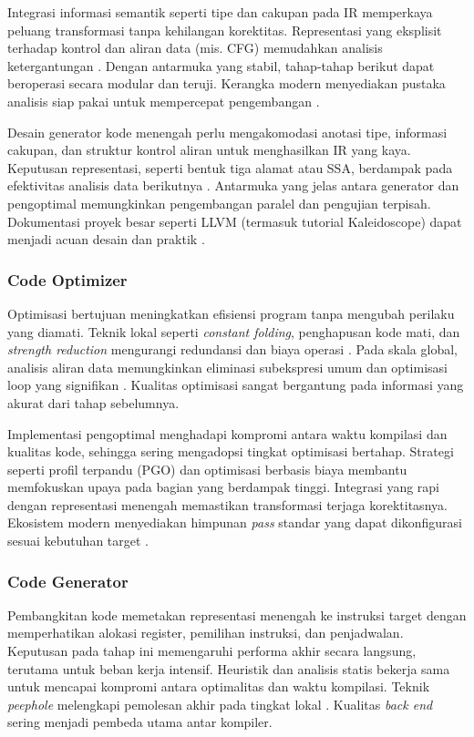 \documentclass[../main.tex]{subfiles}
\begin{document}
Integrasi informasi semantik seperti tipe dan cakupan pada IR memperkaya peluang transformasi tanpa kehilangan korektitas. Representasi yang eksplisit terhadap kontrol dan aliran data (mis. CFG) memudahkan analisis ketergantungan \citep{WikiCFG}. Dengan antarmuka yang stabil, tahap-tahap berikut dapat beroperasi secara modular dan teruji. Kerangka modern menyediakan pustaka analisis siap pakai untuk mempercepat pengembangan \citep{LLVMOverview}.

Desain generator kode menengah perlu mengakomodasi anotasi tipe, informasi cakupan, dan struktur kontrol aliran untuk menghasilkan IR yang kaya. Keputusan representasi, seperti bentuk tiga alamat atau SSA, berdampak pada efektivitas analisis data berikutnya \citep{WikiSSA}. Antarmuka yang jelas antara generator dan pengoptimal memungkinkan pengembangan paralel dan pengujian terpisah. Dokumentasi proyek besar seperti LLVM (termasuk tutorial Kaleidoscope) dapat menjadi acuan desain dan praktik \citep{LLVMOverview,LLVMKaleidoscope}.

\subsubsection{Code Optimizer}
Optimisasi bertujuan meningkatkan efisiensi program tanpa mengubah perilaku yang diamati. Teknik lokal seperti \emph{constant folding}, penghapusan kode mati, dan \emph{strength reduction} mengurangi redundansi dan biaya operasi \citep{WikiConstantFolding,WikiDCE,WikiStrengthReduction}. Pada skala global, analisis aliran data memungkinkan eliminasi subekspresi umum dan optimisasi loop yang signifikan \citep{WikiCSE,WikiLoopOptimization}. Kualitas optimisasi sangat bergantung pada informasi yang akurat dari tahap sebelumnya.

Implementasi pengoptimal menghadapi kompromi antara waktu kompilasi dan kualitas kode, sehingga sering mengadopsi tingkat optimisasi bertahap. Strategi seperti profil terpandu (PGO) dan optimisasi berbasis biaya membantu memfokuskan upaya pada bagian yang berdampak tinggi. Integrasi yang rapi dengan representasi menengah memastikan transformasi terjaga korektitasnya. Ekosistem modern menyediakan himpunan \emph{pass} standar yang dapat dikonfigurasi sesuai kebutuhan target \citep{LLVMOverview,WikiOptimization}.

\subsubsection{Code Generator}
Pembangkitan kode memetakan representasi menengah ke instruksi target dengan memperhatikan alokasi register, pemilihan instruksi, dan penjadwalan. Keputusan pada tahap ini memengaruhi performa akhir secara langsung, terutama untuk beban kerja intensif. Heuristik dan analisis statis bekerja sama untuk mencapai kompromi antara optimalitas dan waktu kompilasi. Teknik \emph{peephole} melengkapi pemolesan akhir pada tingkat lokal \citep{WikiPeephole}. Kualitas \emph{back end} sering menjadi pembeda utama antar kompiler.
\end{document}
